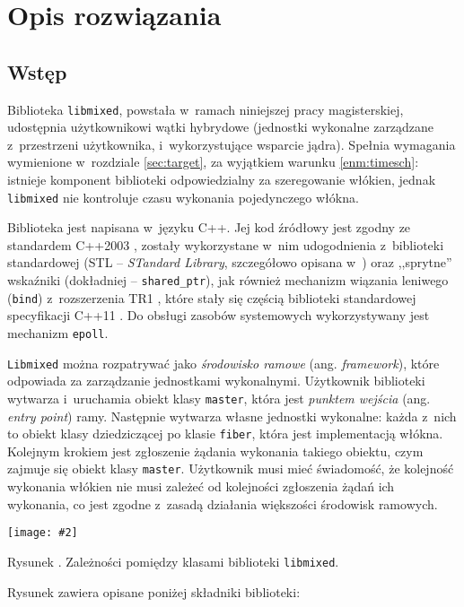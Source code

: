 \documentclass[12pt]{mwart}
\newcommand{\code}{\texttt}
\newcounter{figmain}
\newcommand{\myownfigure}[4]{ \newcounter{#1} \setcounter{#1}{\value{figmain}} \addtocounter{figmain}{1} \begin{center} \label{fig:#1} \centering \texttt{[image: \#2]}\\ \nopagebreak[5] \parbox[t]{11.5cm}{Rysunek \arabic{#1}. #3.} \end{center}}
\begin{document}
\section{Opis rozwiązania}
\label{sec:solution}
\subsection{Wstęp}
\indent 
  Biblioteka \code{libmixed}, powstała w~ramach niniejszej pracy magisterskiej, udostępnia użytkownikowi wątki hybrydowe (jednostki wykonalne zarządzane z~przestrzeni użytkownika,
  i~wykorzystujące wsparcie jądra). Spełnia wymagania wymienione w~rozdziale \ref{sec:target}, za wyjątkiem warunku \ref{enm:timesch}:
  istnieje komponent biblioteki odpowiedzialny za szeregowanie włókien, jednak \code{libmixed} nie kontroluje czasu wykonania pojedynczego włókna.
\par
\indent
  Biblioteka jest napisana w~języku C++. Jej kod źródłowy jest zgodny ze standardem C++2003 \cite{cpp2003}, 
  zostały wykorzystane w~nim udogodnienia z~biblioteki standardowej
  (STL -- \emph{STandard Library}, szczegółowo opisana w~\cite{stroustrup})
  oraz ,,sprytne'' wskaźniki (dokładniej -- \code{shared\_ptr}), 
  jak również mechanizm wiązania leniwego (\code{bind}) z~rozszerzenia TR1 \cite{cpptr1}, które stały się częścią
  biblioteki standardowej specyfikacji C++11 \cite{cpp11}.
  Do obsługi zasobów systemowych wykorzystywany jest mechanizm \code{epoll}.
\par
\indent
  \code{Libmixed} można rozpatrywać jako \emph{środowisko ramowe} (ang. \emph{framework}), które odpowiada za zarządzanie jednostkami wykonalnymi.
  Użytkownik biblioteki wytwarza i~uruchamia obiekt klasy \code{master}, która jest \emph{punktem wejścia} (ang. \emph{entry point}) ramy.
  Następnie wytwarza własne jednostki wykonalne: każda z~nich to obiekt klasy dziedziczącej po klasie \code{fiber}, która jest implementacją włókna.
  Kolejnym krokiem jest zgłoszenie żądania wykonania takiego obiektu, czym zajmuje się obiekt klasy \code{master}.
  Użytkownik musi mieć świadomość, że kolejność wykonania włókien nie musi zależeć od kolejności zgłoszenia żądań ich wykonania, co jest zgodne z~zasadą działania
  większości środowisk ramowych.
\par
\begin{center}
  \myownfigure{libmixedoverview}{libmixedOverview.png}{Zależności pomiędzy klasami biblioteki \code{libmixed}}{.7}
\end{center}
%
\indent
  Rysunek  zawiera opisane poniżej składniki biblioteki:
\end{document}
